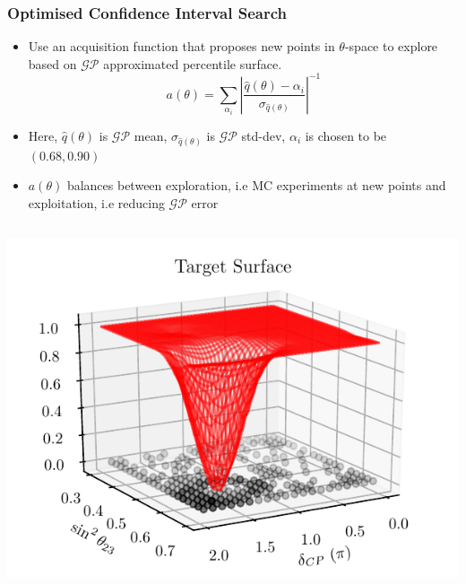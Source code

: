 \documentclass[9pt, aspectratio=169]{beamer}
\begin{document}
\begin{frame}
\begin{columns}
  \end{columns}
\end{frame}
\begin{frame}
  \frametitle{Optimised Confidence Interval Search}
  \begin{itemize}
    \item Use an acquisition function that proposes new points in $\theta$-space to explore based on $\mathcal{GP}$ approximated percentile surface.
      \begin{equation*}
    a(\theta) = \sum_{\alpha_i}|\frac{\hat{q}(\theta)-\alpha_i}{\sigma_{\hat{q}(\theta)}}|^{-1}
      \end{equation*}
    \item Here, $\hat{q}(\theta)$ is $\mathcal{GP}$ mean, $\sigma_{\hat{q}(\theta)}$ is $\mathcal{GP}$ std-dev, $\alpha_i$ is chosen to be $(0.68, 0.90)$
    \item $a(\theta)$ balances between exploration, i.e MC experiments at new points and exploitation, i.e reducing $\mathcal{GP}$ error
  \end{itemize}
  \begin{columns}
    \includegraphics[scale=0.6]{figures_final/target_sdcp_inverted.pdf}

\end{columns}
\end{frame}
\end{document}
